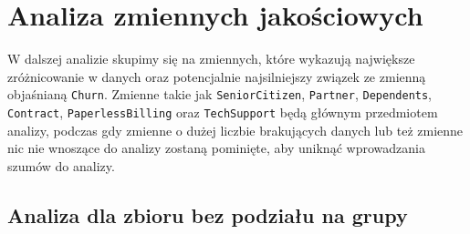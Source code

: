 \documentclass[12pt, a4paper]{article}\usepackage[]{graphicx}\usepackage[]{xcolor}
\begin{document}
\newpage
\section{Analiza zmiennych jakościowych}
W dalszej analizie skupimy się na zmiennych, które wykazują największe zróżnicowanie w danych oraz potencjalnie najsilniejszy związek ze zmienną objaśnianą \texttt{Churn}. Zmienne takie jak \texttt{SeniorCitizen}, \texttt{Partner}, \texttt{Dependents}, \texttt{Contract}, \texttt{PaperlessBilling} oraz \texttt{TechSupport} będą głównym przedmiotem analizy, podczas gdy zmienne o dużej liczbie brakujących danych lub też zmienne nic nie wnoszące do analizy zostaną pominięte, aby uniknąć wprowadzania szumów do analizy.

\subsection{Analiza dla zbioru bez podziału na grupy}
\end{document}

